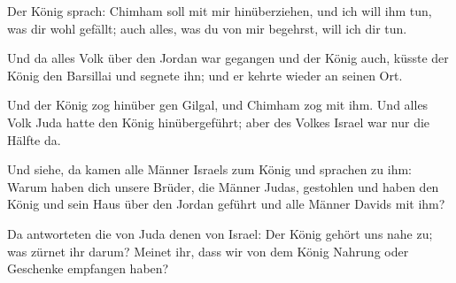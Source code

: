  Der König sprach: Chimham soll mit mir hinüberziehen, und
ich will ihm tun, was dir wohl gefällt; auch alles, was du von mir
begehrst, will ich dir tun.

 Und da alles Volk über den Jordan war gegangen und der
König auch, küsste der König den Barsillai und segnete ihn; und er
kehrte wieder an seinen Ort.

 Und der König zog hinüber gen Gilgal, und Chimham zog mit
ihm. Und alles Volk Juda hatte den König hinübergeführt; aber des Volkes
Israel war nur die Hälfte da.

 Und siehe, da kamen alle Männer Israels zum König und
sprachen zu ihm: Warum haben dich unsere Brüder, die Männer Judas,
gestohlen und haben den König und sein Haus über den Jordan geführt und
alle Männer Davids mit ihm?

 Da antworteten die von Juda denen von Israel: Der König
gehört uns nahe zu; was zürnet ihr darum? Meinet ihr, dass wir von dem
König Nahrung oder Geschenke empfangen haben?

